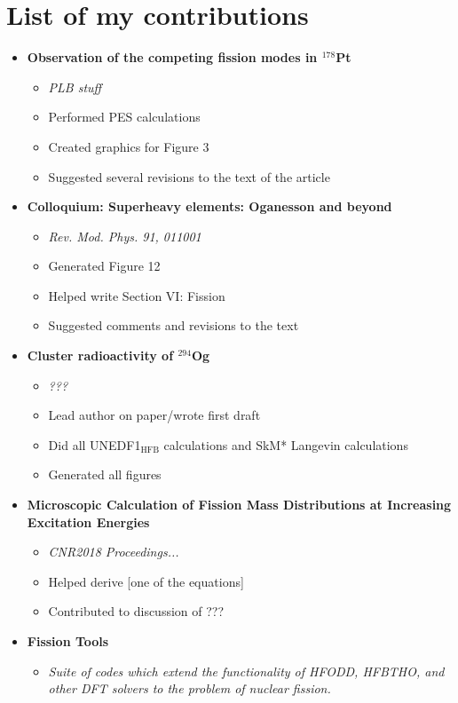 \chapter{List of my contributions}\label{append:Contributions}

\begin{itemize}
	\item \textbf{Observation of the competing fission modes in $^{178}$Pt}
	\begin{itemize}
		\item \textit{PLB stuff}
		\item Performed PES calculations
		\item Created graphics for Figure 3
		\item Suggested several revisions to the text of the article
	\end{itemize}
	\item \textbf{Colloquium: Superheavy elements: Oganesson and beyond}
	\begin{itemize}
		\item \textit{Rev. Mod. Phys. 91, 011001}
		\item Generated Figure 12
		\item Helped write Section VI: Fission
		\item Suggested comments and revisions to the text
	\end{itemize}
	\item \textbf{Cluster radioactivity of $^{294}$Og}
	\begin{itemize}
		\item \textit{???}
		\item Lead author on paper/wrote first draft
		\item Did all UNEDF1$_{\mathrm{HFB}}$ calculations and SkM* Langevin calculations
		\item Generated all figures
	\end{itemize}
	\item \textbf{Microscopic Calculation of Fission Mass Distributions at Increasing Excitation Energies}
	\begin{itemize}
		\item \textit{CNR2018 Proceedings...}
		\item Helped derive [one of the equations]
		\item Contributed to discussion of ???
	\end{itemize}
	\item \textbf{Fission Tools}
	\begin{itemize}
		\item \textit{Suite of codes which extend the functionality of HFODD, HFBTHO, and other DFT solvers to the problem of nuclear fission.}

\end{itemize}
\end{itemize}
